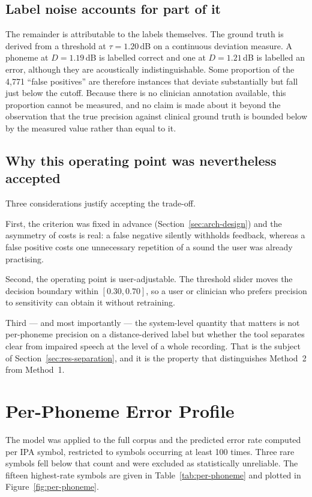 \subsection{Label noise accounts for part of it}

The remainder is attributable to the labels themselves. The ground truth is
derived from a threshold at $\tau = 1.20$\,dB on a continuous deviation
measure. A phoneme at $D = 1.19$\,dB is labelled correct and one at
$D = 1.21$\,dB is labelled an error, although they are acoustically
indistinguishable. Some proportion of the 4{,}771 ``false positives'' are
therefore instances that deviate substantially but fall just below the cutoff.
Because there is no clinician annotation available, this proportion cannot be
measured, and no claim is made about it beyond the observation that the true
precision against clinical ground truth is bounded below by the measured value
rather than equal to it.

\subsection{Why this operating point was nevertheless accepted}

Three considerations justify accepting the trade-off.

First, the criterion was fixed in advance (Section~\ref{sec:arch-design}) and
the asymmetry of costs is real: a false negative silently withholds feedback,
whereas a false positive costs one unnecessary repetition of a sound the user
was already practising.

Second, the operating point is user-adjustable. The threshold slider moves the
decision boundary within $[0.30, 0.70]$, so a user or clinician who prefers
precision to sensitivity can obtain it without retraining.

Third --- and most importantly --- the system-level quantity that matters is not
per-phoneme precision on a distance-derived label but whether the tool separates
clear from impaired speech at the level of a whole recording. That is the
subject of Section~\ref{sec:res-separation}, and it is the property that
distinguishes Method~2 from Method~1.

\section{Per-Phoneme Error Profile}
\label{sec:per-phoneme}

The model was applied to the full corpus and the predicted error rate computed
per IPA symbol, restricted to symbols occurring at least 100 times. Three rare
symbols fell below that count and were excluded as statistically unreliable. The
fifteen highest-rate symbols are given in Table~\ref{tab:per-phoneme} and
plotted in Figure~\ref{fig:per-phoneme}.

